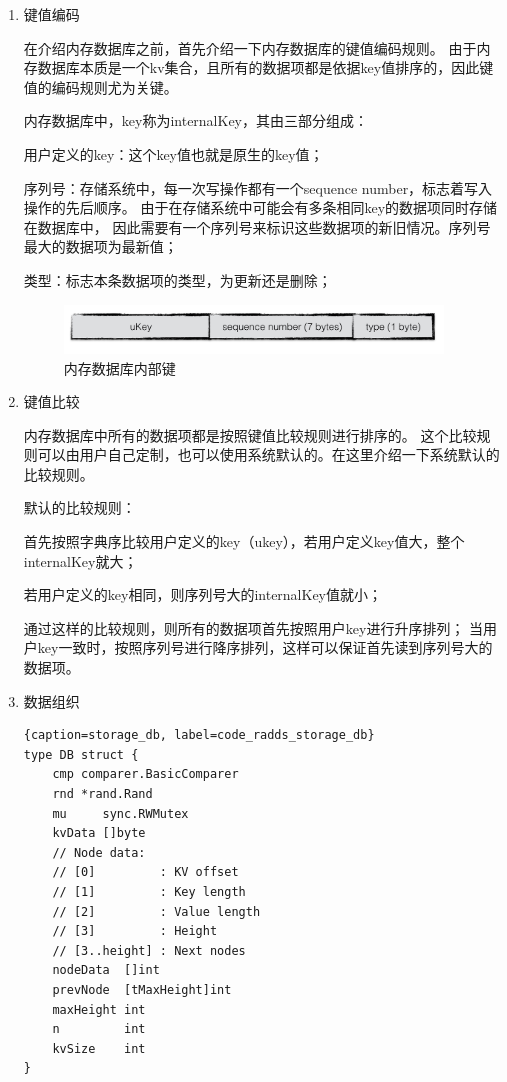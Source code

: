 		\begin{enumerate}
			\item 键值编码
			
			在介绍内存数据库之前，首先介绍一下内存数据库的键值编码规则。
			由于内存数据库本质是一个kv集合，且所有的数据项都是依据key值排序的，因此键值的编码规则尤为关键。

			内存数据库中，key称为internalKey，其由三部分组成：

			用户定义的key：这个key值也就是原生的key值；
			
			序列号：存储系统中，每一次写操作都有一个sequence number，标志着写入操作的先后顺序。
			由于在存储系统中可能会有多条相同key的数据项同时存储在数据库中，
			因此需要有一个序列号来标识这些数据项的新旧情况。序列号最大的数据项为最新值；
			
			类型：标志本条数据项的类型，为更新还是删除；

			\begin{figure}[H]
				\centering
				\includegraphics[width=0.95\textwidth]{images/internalkey}
				\caption{内存数据库内部键}
				\label{internalkey}
			\end{figure}

			\item 键值比较
			
			内存数据库中所有的数据项都是按照键值比较规则进行排序的。
			这个比较规则可以由用户自己定制，也可以使用系统默认的。在这里介绍一下系统默认的比较规则。

			默认的比较规则：

			首先按照字典序比较用户定义的key（ukey），若用户定义key值大，整个internalKey就大；
			
			若用户定义的key相同，则序列号大的internalKey值就小；
			
			通过这样的比较规则，则所有的数据项首先按照用户key进行升序排列；
			当用户key一致时，按照序列号进行降序排列，这样可以保证首先读到序列号大的数据项。


			\item 数据组织
			
			\begin{lstlisting}{caption=storage_db, label=code_radds_storage_db}
type DB struct {
	cmp comparer.BasicComparer
	rnd *rand.Rand
	mu     sync.RWMutex
	kvData []byte
	// Node data:
	// [0]         : KV offset
	// [1]         : Key length
	// [2]         : Value length
	// [3]         : Height
	// [3..height] : Next nodes
	nodeData  []int
	prevNode  [tMaxHeight]int
	maxHeight int
	n         int
	kvSize    int
}
		\end{lstlisting}
				

\end{enumerate}

